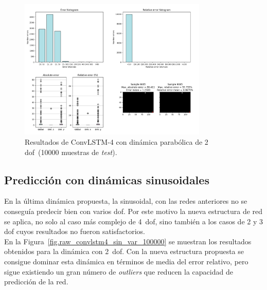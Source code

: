 \begin{figure}[H]
		\begin{center}
			\includegraphics[width=0.8\textwidth]{ figures/test_raw/REC/ConvLSTM_complex/parabolic_var1_100000.png}
			\caption{Resultados de ConvLSTM-4 con dinámica parabólica de 2 \acrshort{dof}~(10000 muestras de \textit{test}).}
			\label{fig.raw_convlstm4_par_var1_100000}
		\end{center}
\end{figure}
\vspace{-10pt}

\subsection{Predicción con dinámicas sinusoidales}
En la última dinámica propuesta, la sinusoidal, con las redes anteriores no se conseguía predecir bien con varios \acrshort{dof}. Por este motivo la nueva estructura de red se aplica, no solo al caso más complejo de 4~\acrshort{dof}, sino también a los casos de 2 y 3 \acrshort{dof} cuyos resultados no fueron satisfactorios.\\

En la Figura~\ref{fig.raw_convlstm4_sin_var_100000} se muestran los resultados obtenidos para la dinámica con 2~\acrshort{dof}. Con la nueva estructura propuesta se consigue dominar esta dinámica en términos de media del error relativo, pero sigue existiendo un gran número de \textit{outliers} que reducen la capacidad de predicción de la red.

